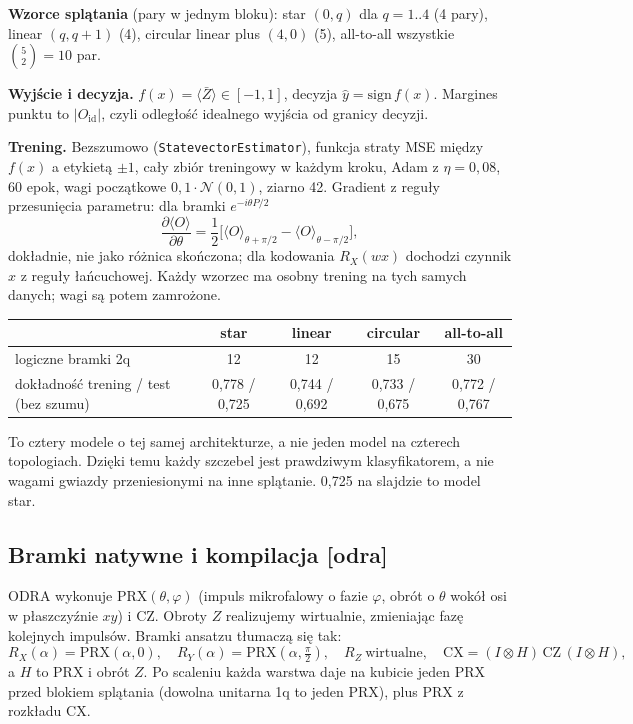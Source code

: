 \documentclass[11pt,a4paper]{article}
\newcommand{\slid}[1]{\hfill{\normalfont\small\ttfamily\color{axbluedk}[#1]}}
\newcommand{\ev}[1]{\langle #1\rangle}
\newcommand{\Oid}{O_{\mathrm{id}}}
\newcommand{\PRX}{\mathrm{PRX}}
\newcommand{\CZ}{\mathrm{CZ}}
\begin{document}
\textbf{Wzorce splątania} (pary w jednym bloku): star $(0,q)$ dla $q=1..4$ (4 pary), linear
$(q,q{+}1)$ (4), circular linear plus $(4,0)$ (5), all-to-all wszystkie $\binom52=10$ par.

\textbf{Wyjście i decyzja.} $f(x)=\ev{\bar Z}\in[-1,1]$, decyzja $\hat y=\mathrm{sign}\,f(x)$.
Margines punktu to $|\Oid|$, czyli odległość idealnego wyjścia od granicy decyzji.

\textbf{Trening.} Bezszumowo (\texttt{StatevectorEstimator}), funkcja straty MSE między $f(x)$ a
etykietą $\pm1$, cały zbiór treningowy w każdym kroku, Adam z $\eta=0{,}08$, 60 epok, wagi
początkowe $0{,}1\cdot\mathcal N(0,1)$, ziarno 42. Gradient z reguły przesunięcia parametru: dla
bramki $e^{-i\theta P/2}$
\[
  \frac{\partial\ev O}{\partial\theta}=\frac12\Big[\ev O_{\theta+\pi/2}-\ev O_{\theta-\pi/2}\Big],
\]
dokładnie, nie jako różnica skończona; dla kodowania $R_X(wx)$ dochodzi czynnik $x$ z reguły
łańcuchowej. Każdy wzorzec ma osobny trening na tych samych danych; wagi są potem zamrożone.

\begin{center}
\begin{tabular}{@{}lcccc@{}}
\toprule
 & star & linear & circular & all-to-all \\
\midrule
logiczne bramki 2q & 12 & 12 & 15 & 30 \\
dokładność trening / test (bez szumu) & 0,778 / 0,725 & 0,744 / 0,692 & 0,733 / 0,675 & 0,772 / 0,767 \\
\bottomrule
\end{tabular}
\end{center}

To cztery modele o tej samej architekturze, a nie jeden model na czterech topologiach. Dzięki
temu każdy szczebel jest prawdziwym klasyfikatorem, a nie wagami gwiazdy przeniesionymi na inne
splątanie. 0,725 na slajdzie to model star.

\subsection{Bramki natywne i kompilacja \slid{odra}}

ODRA wykonuje $\PRX(\theta,\varphi)$ (impuls mikrofalowy o fazie $\varphi$, obrót o $\theta$ wokół
osi w płaszczyźnie $xy$) i CZ. Obroty $Z$ realizujemy wirtualnie, zmieniając fazę kolejnych
impulsów. Bramki ansatzu tłumaczą się tak:
\[
  R_X(\alpha)=\PRX(\alpha,0),\quad R_Y(\alpha)=\PRX(\alpha,\tfrac\pi2),\quad
  R_Z\ \text{wirtualne},\quad \mathrm{CX}=(I\otimes H)\,\CZ\,(I\otimes H),
\]
a $H$ to PRX i obrót $Z$. Po scaleniu każda warstwa daje na kubicie jeden PRX przed blokiem
splątania (dowolna unitarna 1q to jeden PRX), plus PRX z rozkładu CX.
\end{document}
